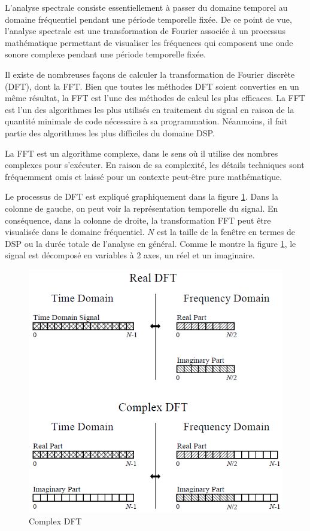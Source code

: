 L’analyse spectrale consiste essentiellement à passer du domaine temporel au domaine fréquentiel pendant une période temporelle fixée. De ce point de vue, l’analyse spectrale est une transformation de Fourier associée à un processus mathématique permettant de visualiser les fréquences qui composent une onde sonore complexe pendant une période temporelle fixée.

Il existe de nombreuses façons de calculer la transformation de Fourier discrète (DFT), dont la FFT. Bien que toutes les méthodes DFT soient converties en un même résultat, la FFT est l’une des méthodes de calcul les plus efficaces. La FFT est l’un des algorithmes les plus utilisés en traitement du signal en raison de la quantité minimale de code nécessaire à sa programmation. Néanmoins, il fait partie des algorithmes les plus difficiles du domaine DSP.

La FFT est un algorithme complexe, dans le sens où il utilise des nombres complexes pour s'exécuter. En raison de sa complexité, les détails techniques sont fréquemment omis et laissé pour un contexte peut-être pure mathématique.

Le processus de DFT est expliqué graphiquement dans la figure \ref{ComplexDFT}. Dans la colonne de gauche, on peut voir la représentation temporelle du signal. En conséquence, dans la colonne de droite, la transformation FFT peut être visualisée dans le domaine fréquentiel. $ N $ est la taille de la fenêtre en termes de DSP ou la durée totale de l'analyse en général. Comme le montre la figure \ref{ComplexDFT}, le signal est décomposé en variables à 2 axes, un réel et un imaginaire.

\begin{figure}
    \centering
    \includegraphics[width = 0.5 \textwidth ]{Graphs/ComplexDFT.png}
    \caption{Complex DFT}
    \label{ComplexDFT}
\end{figure}

